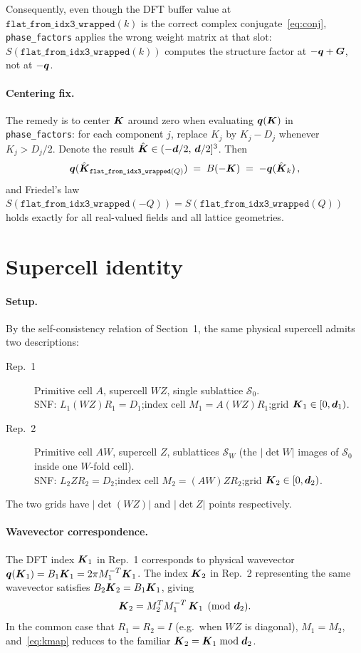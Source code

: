 \documentclass[12pt,a4paper]{article}
\newcommand\bs[1]{\ensuremath\boldsymbol{#1}}
\begin{document}
Consequently, even though the DFT buffer value at $\texttt{flat\_from\_idx3\_wrapped}(k)$
is the correct complex conjugate~\eqref{eq:conj}, \texttt{phase\_factors}
applies the wrong weight matrix at that slot: $S(\texttt{flat\_from\_idx3\_wrapped}(k))$
computes the structure factor at $-\bs{q}+\bs{G}$, not at $-\bs{q}$.

\paragraph{Centering fix.}
The remedy is to center $\bs{K}$ around zero when evaluating $\bs{q}(\bs{K})$
in \texttt{phase\_factors}: for each component $j$, replace $K_j$ by
$K_j - D_j$ whenever $K_j > D_j/2$.  Denote the result $\hat{\bs{K}}
\in (-\bs{d}/2,\,\bs{d}/2]^3$.  Then
\[
    \bs{q}(\hat{\bs{K}}_{\texttt{flat\_from\_idx3\_wrapped}(Q)})
    \;=\; B(-\bs{K}) \;=\; -\bs{q}(\hat{\bs{K}}_k)\,,
\]
and Friedel's law $S(\texttt{flat\_from\_idx3\_wrapped}(-Q)) = S(\texttt{flat\_from\_idx3\_wrapped}(Q))$ holds exactly for all
real-valued fields and all lattice geometries.

\section{Supercell identity}

\paragraph{Setup.}
By the self-consistency relation of Section~1, the same physical supercell admits two descriptions:
\begin{description}
    \item[Rep.\ 1] Primitive cell $A$, supercell $WZ$, single sublattice $\mathcal{S}_0$.\\
        SNF: $L_1(WZ)R_1 = D_1$;\quad index cell $M_1 = A(WZ)R_1$;\quad grid $\bs{K}_1 \in [0,\bs{d}_1)$.
    \item[Rep.\ 2] Primitive cell $AW$, supercell $Z$, sublattices $\mathcal{S}_W$ (the $|\det W|$ images of
        $\mathcal{S}_0$ inside one $W$-fold cell).\\
        SNF: $L_2 Z R_2 = D_2$;\quad index cell $M_2 = (AW)ZR_2$;\quad grid $\bs{K}_2 \in [0,\bs{d}_2)$.
\end{description}
The two grids have $|\det(WZ)|$ and $|\det Z|$ points respectively.

\paragraph{Wavevector correspondence.}
The DFT index $\bs{K}_1$ in Rep.\ 1 corresponds to physical wavevector
$\bs{q}(\bs{K}_1) = B_1\bs{K}_1 = 2\pi M_1^{-T}\bs{K}_1$.
The index $\bs{K}_2$ in Rep.\ 2 representing the same wavevector satisfies
$B_2\bs{K}_2 = B_1\bs{K}_1$, giving
\begin{equation}
    \bs{K}_2 = M_2^T M_1^{-T}\, \bs{K}_1 \pmod{\bs{d}_2}.
    \label{eq:kmap}
\end{equation}
In the common case that $R_1 = R_2 = I$ (e.g.\ when $WZ$ is diagonal),
$M_1 = M_2$, and~\eqref{eq:kmap} reduces to the familiar $\bs{K}_2 = \bs{K}_1 \bmod \bs{d}_2$.
\end{document}
